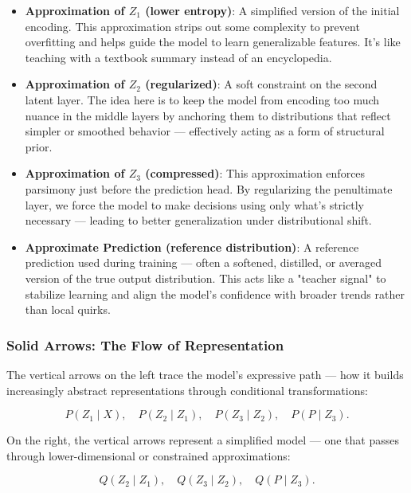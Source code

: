 \begin{itemize}
    \item \textbf{Approximation of \( Z_1 \) (lower entropy)}: A simplified version of the initial encoding. This approximation strips out some complexity to prevent overfitting and helps guide the model to learn generalizable features. It’s like teaching with a textbook summary instead of an encyclopedia.

    \item \textbf{Approximation of \( Z_2 \) (regularized)}: A soft constraint on the second latent layer. The idea here is to keep the model from encoding too much nuance in the middle layers by anchoring them to distributions that reflect simpler or smoothed behavior — effectively acting as a form of structural prior.

    \item \textbf{Approximation of \( Z_3 \) (compressed)}: This approximation enforces parsimony just before the prediction head. By regularizing the penultimate layer, we force the model to make decisions using only what’s strictly necessary — leading to better generalization under distributional shift.

    \item \textbf{Approximate Prediction (reference distribution)}: A reference prediction used during training — often a softened, distilled, or averaged version of the true output distribution. This acts like a "teacher signal" to stabilize learning and align the model’s confidence with broader trends rather than local quirks.
\end{itemize}





\subsubsection{Solid Arrows: The Flow of Representation}

The vertical arrows on the left trace the model’s expressive path — how it builds increasingly abstract representations through conditional transformations:

\[
P(Z_1 \mid X), \quad P(Z_2 \mid Z_1), \quad P(Z_3 \mid Z_2), \quad P(P \mid Z_3).
\]

On the right, the vertical arrows represent a simplified model — one that passes through lower-dimensional or constrained approximations:

\[
Q(Z_2 \mid Z_1), \quad Q(Z_3 \mid Z_2), \quad Q(P \mid Z_3).
\]

